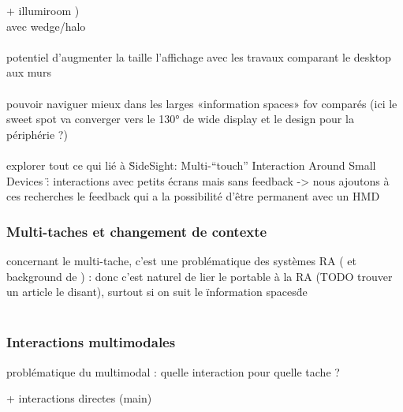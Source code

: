 + illumiroom \cite{JonesBenkoOfekEtAl2013})\\
avec wedge/halo \cite{BaudischRosenholtz2003} \cite{GustafsonBaudischGutwinEtAl2008} \cite{BurigatChittaro2011}\\

\paragraph{}
potentiel d'augmenter la taille l'affichage avec les travaux comparant le desktop aux murs \cite{LiuChapuisBeaudouin-LafonEtAl2014} \cite{ShuppBallYostEtAl2006} \cite{TanGergleScupelliEtAl2003}

\paragraph{}
pouvoir naviguer mieux dans les larges «information spaces» fov comparés \cite{RaedleJetterMuellerEtAl2014} (ici le sweet spot va converger vers le 130° de wide display et le design pour la périphérie ?)

\paragraph{}
explorer tout ce qui lié à \"SideSight: Multi-“touch” Interaction Around Small Devices \" : interactions avec petits écrans mais sans feedback -> nous ajoutons à ces recherches le feedback qui a la possibilité d'être permanent avec un HMD


\subsubsection{Multi-taches et changement de contexte}
concernant le multi-tache, c'est une problématique des systèmes RA (\cite{SchmalstiegFuhrmannHesinaEtAl2002} et background de \cite{EnsFinneganIrani2014}) : donc c'est naturel de lier le portable à la RA (TODO trouver un article le disant), surtout si on suit le \"information spaces\" de \cite{EnsHincapie-RamosIrani2014}\\
\cite{TanCzerwinski2003}\\
\cite{RashidNacentaQuigley2012a}


\subsubsection{Interactions multimodales}
problématique du multimodal : quelle interaction pour quelle tache ?

+ interactions directes (main)


